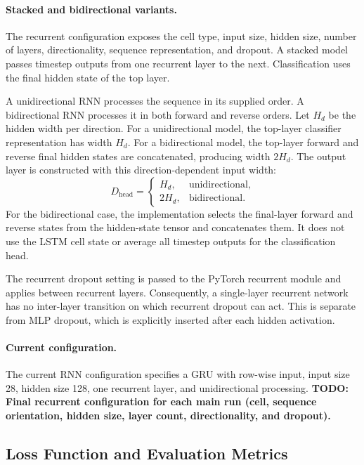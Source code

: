 \documentclass[11pt,a4paper]{article}
\begin{document}
\paragraph{Stacked and bidirectional variants.} The recurrent configuration exposes the cell type, input size, hidden size, number of layers, directionality, sequence representation, and dropout. A stacked model passes timestep outputs from one recurrent layer to the next. Classification uses the final hidden state of the top layer.

A unidirectional RNN processes the sequence in its supplied order. A bidirectional RNN processes it in both forward and reverse orders. Let \(H_d\) be the hidden width per direction. For a unidirectional model, the top-layer classifier representation has width \(H_d\). For a bidirectional model, the top-layer forward and reverse final hidden states are concatenated, producing width \(2H_d\). The output layer is constructed with this direction-dependent input width:
\[
D_{\mathrm{head}}=
\begin{cases}
H_d, & \text{unidirectional},\\
2H_d, & \text{bidirectional}.
\end{cases}
\]
For the bidirectional case, the implementation selects the final-layer forward and reverse states from the hidden-state tensor and concatenates them. It does not use the LSTM cell state or average all timestep outputs for the classification head.

The recurrent dropout setting is passed to the PyTorch recurrent module and applies between recurrent layers. Consequently, a single-layer recurrent network has no inter-layer transition on which recurrent dropout can act. This is separate from MLP dropout, which is explicitly inserted after each hidden activation.

\paragraph{Current configuration.} The current RNN configuration specifies a GRU with row-wise input, input size 28, hidden size 128, one recurrent layer, and unidirectional processing. \textbf{TODO: Final recurrent configuration for each main run (cell, sequence orientation, hidden size, layer count, directionality, and dropout).}

\subsection{Loss Function and Evaluation Metrics}
\end{document}

